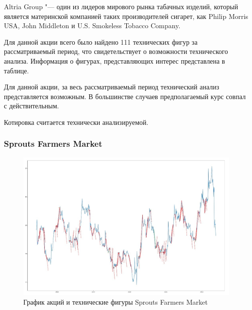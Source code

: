 \documentclass[bachelor, och, coursework]{SCWorks}
\begin{document}
        
        Altria Group "--- один из лидеров мирового рынка табачных изделий,
        который является материнской компанией таких производителей сигарет, как
        Philip Morris USA, John Middleton и U.S. Smokeless Tobacco Company.
    
        
        Для данной акции всего было найдено 111 технических фигур за 
        рассматриваемый период, что свидетельствует о возможности технического 
        анализа. Информация о фигурах, представляющих интерес представлена в 
        таблице.
        
        Для данной акции, за весь рассматриваемый период технический анализ 
        представляется возможным. В большинстве случаев предполагаемый курс 
        совпал с действительным.
        
        Котировка считается технически анализируемой.

        \subsubsection{Sprouts Farmers Market}
    
        \begin{figure}[H]
            \centering
            \includegraphics[width=\textwidth]{pic/SFM.jpg}
            \caption{График акций и технические фигуры Sprouts Farmers Market}
        \end{figure}
       
        \pagebreak
\end{document}
